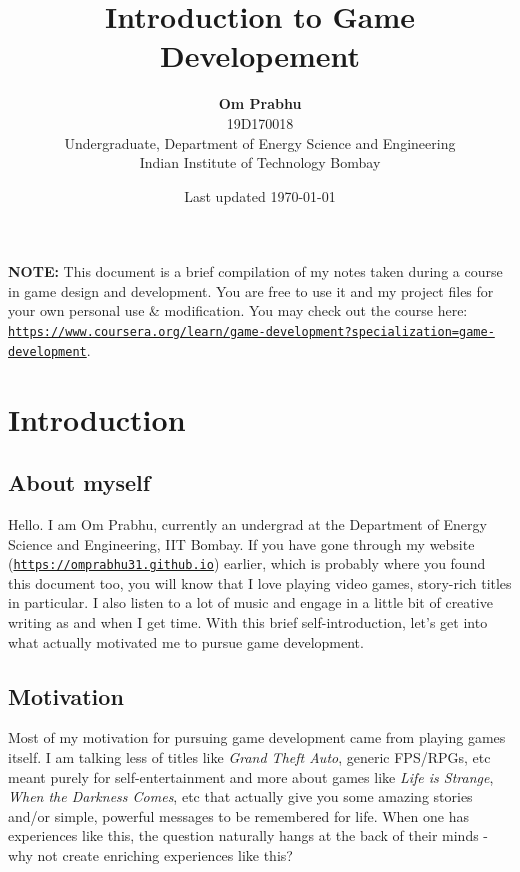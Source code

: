 \documentclass{article}[a4paper,12pt]
\title{\textbf{Introduction to Game Developement}}
\author{
	\textbf{Om Prabhu}\\
	19D170018\\
	Undergraduate, Department of Energy Science and Engineering\\
	Indian Institute of Technology Bombay\\}
\date{Last updated \today}
\theoremstyle{definition}
\begin{document}
\maketitle
\vspace{-12pt}
\hrulefill
\vspace{6pt}

\textbf{NOTE:} This document is a brief compilation of my notes taken during a course in game design and development. You are free to use it and my project files for your own personal use \& modification. You may check out the course here: \texttt{\href{https://www.coursera.org/learn/game-development?specialization=game-development}{https://www.coursera.org/learn/game-development?specialization=game-development}}.

\hrulefill
\tableofcontents
\vspace{6pt}

\hrulefill
\pagebreak

\section{Introduction}
\subsection{About myself}
Hello. I am Om Prabhu, currently an undergrad at the Department of Energy Science and Engineering, IIT Bombay. If you have gone through my website (\texttt{\href{https://omprabhu31.github.io}{https://omprabhu31.github.io}}) earlier, which is probably where you found this document too, you will know that I love playing video games, story-rich titles in particular. I also listen to a lot of music and engage in a little bit of creative writing as and when I get time. With this brief self-introduction, let's get into what actually motivated me to pursue game development.

\subsection{Motivation}
Most of my motivation for pursuing game development came from playing games itself. I am talking less of titles like \textit{Grand Theft Auto}, generic FPS/RPGs, etc meant purely for self-entertainment and more about games like \textit{Life is Strange}, \textit{When the Darkness Comes}, etc that actually give you some amazing stories and/or simple, powerful messages to be remembered for life. When one has experiences like this, the question naturally hangs at the back of their minds - why not create enriching experiences like this?
\vspace{6pt}
\end{document}
